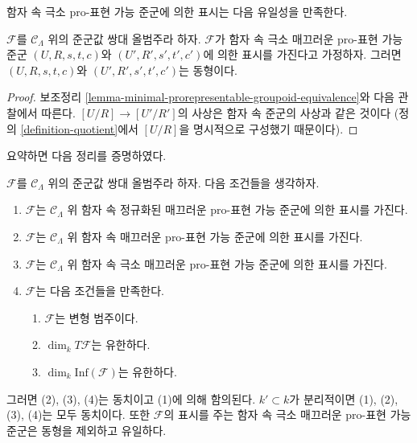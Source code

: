 \noindent
함자 속 극소 pro-표현 가능 준군에 의한 표시는 다음 유일성을 만족한다.

\begin{lemma}
\label{lemma-minimal-presentations-equivalent}
$\mathcal{F}$를 $\mathcal{C}_\Lambda$ 위의 준군값 쌍대 올범주라 하자.
$\mathcal{F}$가 함자 속 극소 매끄러운 pro-표현 가능 준군
$(U, R, s, t, c)$와 $(U', R', s', t', c')$에 의한 표시를 가진다고
가정하자. 그러면 $(U, R, s, t, c)$와
$(U', R', s', t', c')$는 동형이다.
\end{lemma}

\begin{proof}
보조정리 \ref{lemma-minimal-prorepresentable-groupoid-equivalence}와
다음 관찰에서 따른다.
$[U/R] \to [U'/R']$의 사상은 함자 속 준군의 사상과 같은 것이다
(정의 \ref{definition-quotient}에서 $[U/R]$을 명시적으로 구성했기 때문이다).
\end{proof}

\noindent
요약하면 다음 정리를 증명하였다.

\begin{theorem}
\label{theorem-minimal-smooth-prorepresentable-presentations}
$\mathcal{F}$를 $\mathcal{C}_\Lambda$ 위의 준군값 쌍대 올범주라 하자.
다음 조건들을 생각하자.
\begin{enumerate}
\item $\mathcal{F}$는 $\mathcal{C}_\Lambda$ 위 함자 속 정규화된
매끄러운 pro-표현 가능 준군에 의한 표시를 가진다.
\item $\mathcal{F}$는 $\mathcal{C}_\Lambda$ 위 함자 속
매끄러운 pro-표현 가능 준군에 의한 표시를 가진다.
\item $\mathcal{F}$는 $\mathcal{C}_\Lambda$ 위 함자 속 극소
매끄러운 pro-표현 가능 준군에 의한 표시를 가진다.
\item $\mathcal{F}$는 다음 조건들을 만족한다.
\begin{enumerate}
\item $\mathcal{F}$는 변형 범주이다.
\item $\dim_k T\mathcal{F}$는 유한하다.
\item $\dim_k \text{Inf}(\mathcal{F})$는 유한하다.
\end{enumerate}
\end{enumerate}
그러면 (2), (3), (4)는 동치이고 (1)에 의해 함의된다.
$k' \subset k$가 분리적이면 (1), (2), (3), (4)는 모두 동치이다.
또한 $\mathcal{F}$의 표시를 주는 함자 속 극소 매끄러운
pro-표현 가능 준군은 동형을 제외하고 유일하다.
\end{theorem}

